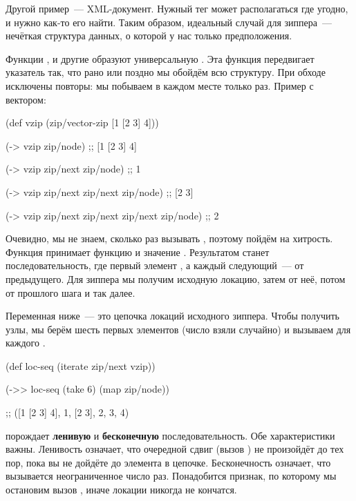 Другой пример~--- XML-документ. Нужный тег может располагаться где угодно, и
нужно как-то его найти. Таким образом, идеальный случай для зиппера~--- нечёткая
структура данных, о которой у нас только предположения.


Функции ,  и другие образуют универсальную . Эта
функция передвигает указатель так, что рано или поздно мы обойдём всю
структуру. При обходе исключены повторы: мы побываем в каждом месте только
раз. Пример с вектором:

\begin{english}
  \begin{clojure}
(def vzip
  (zip/vector-zip [1 [2 3] 4]))

(-> vzip zip/node)
;; [1 [2 3] 4]

(-> vzip zip/next zip/node)
;; 1

(-> vzip zip/next zip/next zip/node)
;; [2 3]

(-> vzip zip/next zip/next zip/next zip/node)
;; 2
  \end{clojure}
\end{english}

Очевидно, мы не знаем, сколько раз вызывать , поэтому пойдём на
хитрость. Функция  принимает функцию  и значение . Результатом
станет последовательность, где первый элемент , а каждый следующий~--- 
от предыдущего. Для зиппера мы получим исходную локацию, затем  от
неё, потом  от прошлого шага и так далее.

Переменная  ниже~--- это цепочка локаций исходного зиппера. Чтобы
получить узлы, мы берём шесть первых элементов (число взяли случайно) и вызываем
для каждого .

\begin{english}
  \begin{clojure}
(def loc-seq
  (iterate zip/next vzip))

(->> loc-seq
     (take 6)
     (map zip/node))

;; ([1 [2 3] 4], 1, [2 3], 2, 3, 4)
  \end{clojure}
\end{english}

 порождает \textbf{ленивую} и \textbf{бесконечную}
последовательность. Обе характеристики важны. Ленивость означает, что очередной
сдвиг (вызов ) не произойдёт до тех пор, пока вы не дойдёте до
элемента в цепочке. Бесконечность означает, что  вызывается
неограниченное число раз. Понадобится признак, по которому мы остановим вызов
, иначе локации никогда не кончатся.

